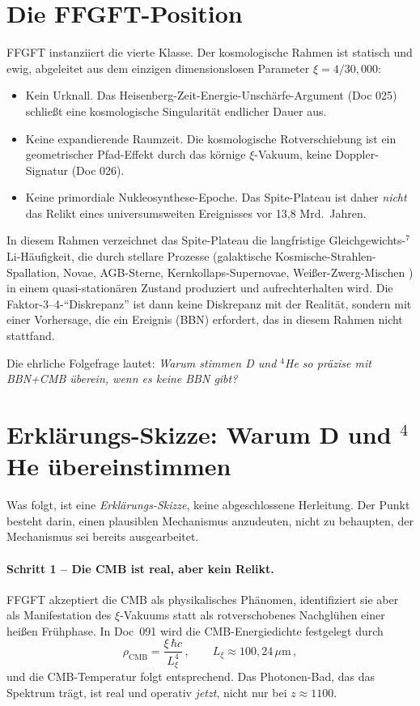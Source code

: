 \documentclass[11pt,a4paper]{article}
\begin{document}
\section{Die FFGFT-Position}

FFGFT instanziiert die vierte Klasse. Der kosmologische Rahmen ist statisch und ewig, abgeleitet aus dem einzigen dimensionslosen Parameter $\xi = 4/30{,}000$:
\begin{itemize}\itemsep1pt
\item Kein Urknall. Das Heisenberg-Zeit-Energie-Unschärfe-Argument (Doc 025) schließt eine kosmologische Singularität endlicher Dauer aus.
\item Keine expandierende Raumzeit. Die kosmologische Rotverschiebung ist ein geometrischer Pfad-Effekt durch das körnige $\xi$-Vakuum, keine Doppler-Signatur (Doc 026).
\item Keine primordiale Nukleosynthese-Epoche. Das Spite-Plateau ist daher \emph{nicht} das Relikt eines universumsweiten Ereignisses vor 13,8 Mrd.\ Jahren.
\end{itemize}

In diesem Rahmen verzeichnet das Spite-Plateau die langfristige Gleichgewichts-$^7$Li-Häufigkeit, die durch stellare Prozesse (galaktische Kosmische-Strahlen-Spallation, Novae, AGB-Sterne, Kernkollaps-Supernovae, Weißer-Zwerg-Mischen \cite{borisov2024}) in einem quasi-stationären Zustand produziert und aufrechterhalten wird. Die Faktor-3--4-``Diskrepanz'' ist dann keine Diskrepanz mit der Realität, sondern mit einer Vorhersage, die ein Ereignis (BBN) erfordert, das in diesem Rahmen nicht stattfand.

Die ehrliche Folgefrage lautet: \emph{Warum stimmen D und $^4$He so präzise mit BBN+CMB überein, wenn es keine BBN gibt?}

\section{Erklärungs-Skizze: Warum D und \texorpdfstring{$^4$He}{4He} übereinstimmen}

Was folgt, ist eine \emph{Erklärungs-Skizze}, keine abgeschlossene Herleitung. Der Punkt besteht darin, einen plausiblen Mechanismus anzudeuten, nicht zu behaupten, der Mechanismus sei bereits ausgearbeitet.

\paragraph{Schritt 1 -- Die CMB ist real, aber kein Relikt.}
FFGFT akzeptiert die CMB als physikalisches Phänomen, identifiziert sie aber als Manifestation des $\xi$-Vakuums statt als rotverschobenes Nachglühen einer heißen Frühphase. In Doc~091 wird die CMB-Energiedichte festgelegt durch
\begin{equation}
\rho_{\mathrm{CMB}} = \frac{\xi\,\hbar c}{L_\xi^4}\,, \qquad L_\xi \approx 100{,}24\,\mu\text{m}\,,
\end{equation}
und die CMB-Temperatur folgt entsprechend. Das Photonen-Bad, das das Spektrum trägt, ist real und operativ \emph{jetzt}, nicht nur bei $z \approx 1100$.
\end{document}
